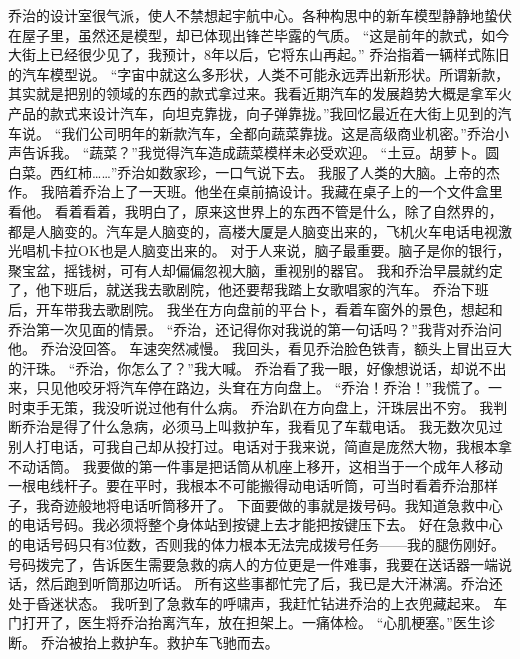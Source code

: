\documentclass[a4paper,12pt,UTF8,twoside]{ctexbook}
\begin{document}
        乔治的设计室很气派，使人不禁想起宇航中心。各种构思中的新车模型静静地蛰伏在屋子里，虽然还是模型，却已体现出锋芒毕露的气质。 
        “这是前年的款式，如今大街上已经很少见了，我预计，8年以后，它将东山再起。” 
        乔治指着一辆样式陈旧的汽车模型说。 
        “字宙中就这么多形状，人类不可能永远弄出新形状。所谓新款，其实就是把别的领域的东西的款式拿过来。我看近期汽车的发展趋势大概是拿军火产品的款式来设计汽车，向坦克靠拢，向子弹靠拢。”我回忆最近在大街上见到的汽车说。 
        “我们公司明年的新款汽车，全都向蔬菜靠拢。这是高级商业机密。”乔治小声告诉我。 
        “蔬菜？”我觉得汽车造成蔬菜模样未必受欢迎。 
        “土豆。胡萝卜。圆白菜。西红柿……”乔治如数家珍，一口气说下去。 
        我服了人类的大脑。上帝的杰作。 
        我陪着乔治上了一天班。他坐在桌前搞设计。我藏在桌子上的一个文件盒里看他。 
        看着看着，我明白了，原来这世界上的东西不管是什么，除了自然界的，都是人脑变的。汽车是人脑变的，高楼大厦是人脑变出来的，飞机火车电话电视激光唱机卡拉OK也是人脑变出来的。 
        对于人来说，脑子最重要。脑子是你的银行，聚宝盆，摇钱树，可有人却偏偏忽视大脑，重视别的器官。 
        我和乔治早晨就约定了，他下班后，就送我去歌剧院，他还要帮我踏上女歌唱家的汽车。 
        乔治下班后，开车带我去歌剧院。 
        我坐在方向盘前的平台卜，看着车窗外的景色，想起和乔治第一次见面的情景。 
        “乔治，还记得你对我说的第一句话吗？”我背对乔治问他。 
        乔治没回答。 
        车速突然减慢。 
        我回头，看见乔治脸色铁青，额头上冒出豆大的汗珠。 
        “乔治，你怎么了？”我大喊。 
        乔治看了我一眼，好像想说话，却说不出来，只见他咬牙将汽车停在路边，头耷在方向盘上。 
        “乔治！乔治！”我慌了。一时束手无策，我没听说过他有什么病。 
        乔治趴在方向盘上，汗珠层出不穷。 
        我判断乔治是得了什么急病，必须马上叫救护车，我看见了车载电话。 
        我无数次见过别人打电话，可我自己却从投打过。电话对于我来说，简直是庞然大物，我根本拿不动话筒。 
        我要做的第一件事是把话筒从机座上移开，这相当于一个成年人移动一根电线杆子。要在平时，我根本不可能搬得动电话听筒，可当时看着乔治那样子，我奇迹般地将电话听筒移开了。 
        下面要做的事就是拨号码。我知道急救中心的电话号码。我必须将整个身体站到按键上去才能把按键压下去。 
        好在急救中心的电话号码只有3位数，否则我的体力根本无法完成拨号任务——我的腿伤刚好。 
        号码拨完了，告诉医生需要急救的病人的方位更是一件难事，我要在送话器一端说话，然后跑到听筒那边听话。 
        所有这些事都忙完了后，我已是大汗淋漓。乔治还处于昏迷状态。 
        我听到了急救车的呼啸声，我赶忙钻进乔治的上衣兜藏起来。 
        车门打开了，医生将乔治抬离汽车，放在担架上。一痛体检。 
        “心肌梗塞。”医生诊断。 
        乔治被抬上救护车。救护车飞驰而去。 
\end{document}
